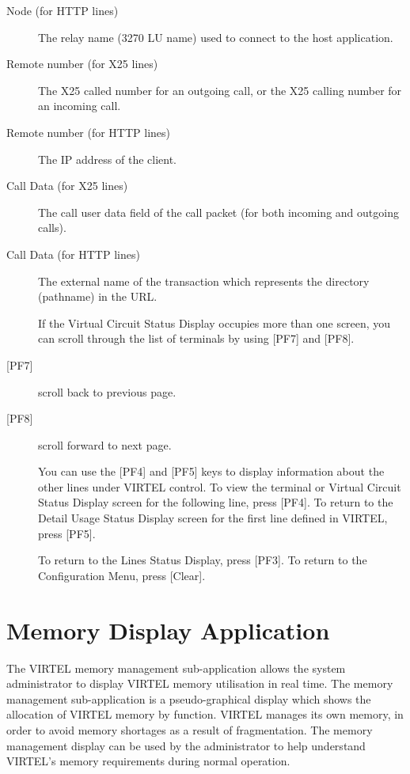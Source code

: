 \documentclass[letterpaper,10pt,english]{sphinxmanual}
\begin{document}
\begin{description}
\item[{Node (for HTTP lines)}] \leavevmode
The relay name (3270 LU name) used to connect to the host application.

\item[{Remote number (for X25 lines)}] \leavevmode
The X25 called number for an outgoing call, or the X25 calling number for an incoming call.

\item[{Remote number (for HTTP lines)}] \leavevmode
The IP address of the client.

\item[{Call Data (for X25 lines)}] \leavevmode
The call user data field of the call packet (for both incoming and outgoing calls).

\item[{Call Data (for HTTP lines)}] \leavevmode
The external name of the transaction which represents the directory (pathname) in the URL.

If the Virtual Circuit Status Display occupies more than one screen, you can scroll through the list of terminals by using {[}PF7{]} and {[}PF8{]}.

\item[{{[}PF7{]}}] \leavevmode
scroll back to previous page.

\item[{{[}PF8{]}}] \leavevmode
scroll forward to next page.

You can use the {[}PF4{]} and {[}PF5{]} keys to display information about the other lines under VIRTEL control. To view the terminal or Virtual Circuit Status Display screen for the following line, press {[}PF4{]}. To return to the Detail Usage Status Display screen for the first line defined in VIRTEL, press {[}PF5{]}.

To return to the Lines Status Display, press {[}PF3{]}. To return to the Configuration Menu, press {[}Clear{]}.

\end{description}

\newpage


\section{Memory Display Application}
\label{\detokenize{audit_operations_ and_performance:index-39}}\label{\detokenize{audit_operations_ and_performance:memory-display-application}}
The VIRTEL memory management sub-application allows the system  administrator to display VIRTEL memory utilisation in real time. The memory management sub-application is a pseudo-graphical display which shows the allocation of VIRTEL memory by function. VIRTEL manages its own memory, in order to avoid memory shortages as a result of fragmentation. The memory management display can be used by the administrator to help understand VIRTEL’s memory requirements during normal operation.
\end{document}
